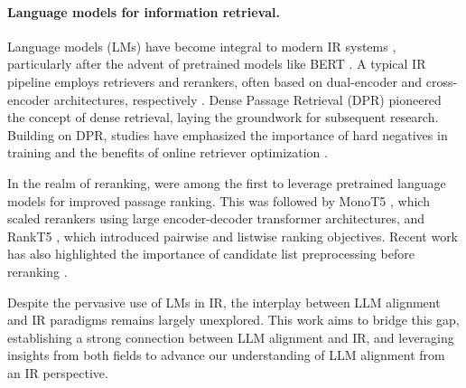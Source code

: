 \paragraph{Language models for information retrieval.}
Language models (LMs) have become integral to modern IR systems \citep{zhu2023large}, particularly after the advent of pretrained models like BERT \citep{kenton2019bert}.  
A typical IR pipeline employs retrievers and rerankers, often based on dual-encoder and cross-encoder architectures, respectively \citep{humeau2019poly}. 
Dense Passage Retrieval (DPR) \citep{karpukhin2020dense} pioneered the concept of dense retrieval, laying the groundwork for subsequent research. 
Building on DPR, studies have emphasized the importance of hard negatives in training \citep{zhan2021optimizing, qu2020rocketqa} and the benefits of online retriever optimization \citep{xiong2020approximate}.

In the realm of reranking, \citep{nogueira2019passage} were among the first to leverage pretrained language models for improved passage ranking. 
This was followed by MonoT5 \citep{nogueira2020document}, which scaled rerankers using large encoder-decoder transformer architectures, and RankT5 \citep{zhuang2023rankt5}, which introduced pairwise and listwise ranking objectives. 
Recent work has also highlighted the importance of candidate list preprocessing before reranking \citep{meng2024ranked}.

Despite the pervasive use of LMs in IR, the interplay between LLM alignment and IR paradigms remains largely unexplored. 
This work aims to bridge this gap, establishing a strong connection between LLM alignment and IR, and leveraging insights from both fields to advance our understanding of LLM alignment from an IR perspective.
